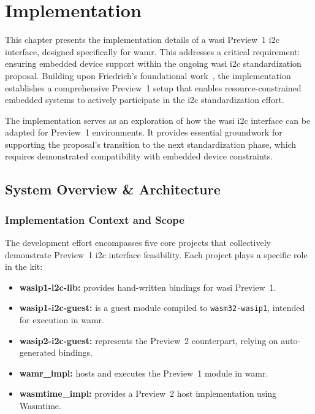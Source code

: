 \chapter{Implementation}
\label{chap:implementation}

This chapter presents the implementation details of a \acrshort{wasi} Preview~1 \acrshort{i2c} interface, designed specifically for \acrshort{wamr}. This addresses a critical requirement: ensuring embedded device support within the ongoing \acrshort{wasi} \acrshort{i2c} standardization proposal. Building upon Friedrich's foundational work~\cite{friedrich_paper, friedrich_impl}, the implementation establishes a comprehensive Preview~1 setup that enables resource-constrained embedded systems to actively participate in the \acrshort{i2c} standardization effort.

The implementation serves as an exploration of how the \acrshort{wasi} \acrshort{i2c} interface can be adapted for Preview~1 environments. It provides essential groundwork for supporting the proposal’s transition to the next standardization phase, which requires demonstrated compatibility with embedded device constraints.

\section{System Overview \& Architecture}
\label{sec:system-overview}

\subsection{Implementation Context and Scope}

The development effort encompasses five core projects that collectively demonstrate Preview~1 \acrshort{i2c} interface feasibility. Each project plays a specific role in the kit:  
\begin{itemize}
    \item \textbf{wasip1-i2c-lib:} provides hand-written bindings for \acrshort{wasi} Preview~1.  
    \item \textbf{wasip1-i2c-guest:} is a guest module compiled to \texttt{wasm32-wasip1}, intended for execution in \acrshort{wamr}.  
    \item \textbf{wasip2-i2c-guest:} represents the Preview~2 counterpart, relying on auto-generated bindings.  
    \item \textbf{wamr\_impl:} hosts and executes the Preview~1 module in \acrshort{wamr}.  
    \item \textbf{wasmtime\_impl:} provides a Preview~2 host implementation using Wasmtime.
\end{itemize}

